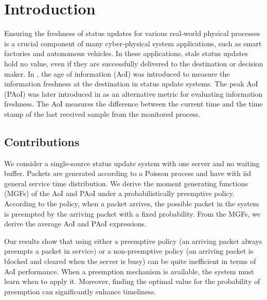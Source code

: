 \documentclass[conference]{IEEEtran}
\begin{document}
\section{Introduction}\label{Introduction}
Ensuring the freshness of status updates for various real-world physical processes is a crucial component of many cyber-physical system applications, such as smart factories and autonomous vehicles. In these applications, stale status updates hold no value, even if they are successfully delivered to the destination or decision maker. In \cite{6195689}, the age of information (AoI)  
 was introduced to measure the information freshness at the destination in status update systems. The peak AoI (PAoI) was later introduced in \cite{6875100} as an alternative metric for evaluating information freshness. 
The AoI measures the difference between the current time and the time stamp of the last received sample from the monitored process. 


\subsection{Contributions}
We consider a single-source status update system with one server and no waiting buffer. Packets are generated according to a Poisson process and have  %
with iid  general  service time distribution. We derive the moment generating functions (MGFs) of the AoI and PAoI under a probabilistically preemptive policy. According to the policy, when a packet arrives, the possible packet in the system is preempted by the arriving packet with a fixed probability. From the MGFs, we derive the average AoI and PAoI expressions. 

Our results show that using either a preemptive policy (an arriving packet always preempts a packet in service) or a non-preemptive policy (an arriving packet is blocked and cleared when the server is busy) can be quite inefficient in terms of AoI performance. When a preemption mechanism is available, the system must learn when to apply it. Moreover, finding the optimal value for the probability of preemption can significantly enhance timeliness.
\end{document}
